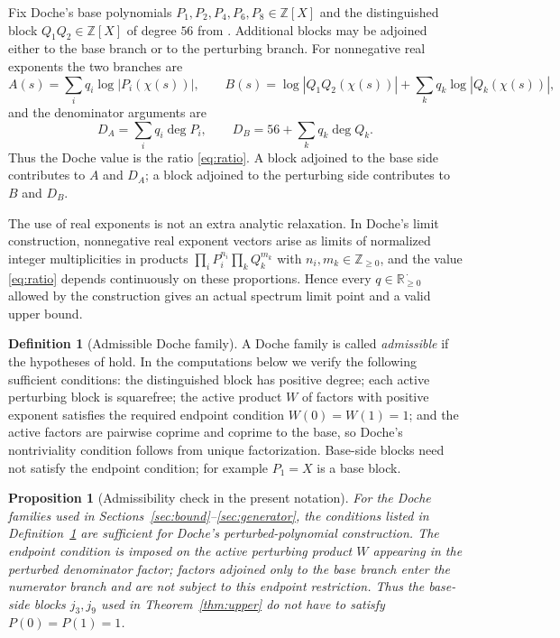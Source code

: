 \documentclass[11pt,reqno]{amsart}
\theoremstyle{plain}
\newtheorem{proposition}[theorem]{Proposition}
\theoremstyle{definition}
\newtheorem{definition}[theorem]{Definition}
\theoremstyle{remark}
\newcommand{\Z}{\mathbb{Z}}
\newcommand{\R}{\mathbb{R}}
\newcommand{\dA}{D_A}
\newcommand{\dB}{D_B}
\begin{document}
Fix Doche's base polynomials $P_1,P_2,P_4,P_6,P_8\in\Z[X]$ and the distinguished
block $Q_1Q_2\in\Z[X]$ of degree $56$ from \citet{Doc01b}.  Additional blocks may be
adjoined either to the base branch or to the perturbing branch.  For nonnegative real
exponents the two branches are
\begin{equation}\label{eq:AB}
  A(s)=\sum_i q_i\log|P_i(\chi(s))|,
  \qquad
  B(s)=\log|Q_1Q_2(\chi(s))|+
       \sum_k q_k\log|Q_k(\chi(s))|,
\end{equation}
and the denominator arguments are
\begin{equation}\label{eq:Dformula}
  \dA=\sum_i q_i\deg P_i,
  \qquad
  \dB=56+\sum_k q_k\deg Q_k .
\end{equation}
Thus the Doche value is the ratio \eqref{eq:ratio}.  A block adjoined to the base side
contributes to $A$ and $\dA$; a block adjoined to the perturbing side contributes to
$B$ and $\dB$.

The use of real exponents is not an extra analytic relaxation.  In Doche's limit
construction, nonnegative real exponent vectors arise as limits of normalized integer
multiplicities in products
$\prod_i P_i^{n_i}\prod_k Q_k^{m_k}$ with $n_i,m_k\in\Z_{\ge0}$, and the value
\eqref{eq:ratio} depends continuously on these proportions.  Hence every
$q\in\R_{\ge0}^{\,\cdot}$ allowed by the construction gives an actual spectrum
limit point and a valid upper bound.

\begin{definition}[Admissible Doche family]\label{def:admissible}
A Doche family is called \emph{admissible} if the hypotheses of
\citet[Lemmas 2--5]{Doc01a} hold.  In the computations below we verify the following
sufficient conditions: the distinguished block has positive degree; each active
perturbing block is squarefree; the active product $W$ of factors with positive
exponent satisfies the required endpoint condition $W(0)=W(1)=1$; and the active
factors are pairwise coprime and coprime to the base, so Doche's nontriviality
condition follows from unique factorization.  Base-side blocks need not satisfy the
endpoint condition; for example $P_1=X$ is a base block.
\end{definition}

\begin{proposition}[Admissibility check in the present notation]\label{prop:admissibility}
For the Doche families used in Sections~\ref{sec:bound}--\ref{sec:generator}, the
conditions listed in Definition~\ref{def:admissible} are sufficient for Doche's
perturbed-polynomial construction.  The endpoint condition is imposed on the active
perturbing product $W$ appearing in the perturbed denominator factor; factors adjoined
only to the base branch enter the numerator branch and are not subject to this endpoint
restriction.  Thus the base-side blocks $j_3,j_9$ used in Theorem~\ref{thm:upper} do not
have to satisfy $P(0)=P(1)=1$.
\end{proposition}
\end{document}
